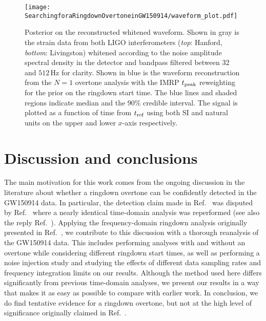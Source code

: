 \begin{figure*}[t]
	\centering
	\texttt{[image: SearchingforaRingdownOvertoneinGW150914/waveform\_plot.pdf]}
	\caption[Posterior on the GW150914 reconstructed whitened waveform]{ 
		Posterior on the reconstructed whitened waveform.
		Shown in gray is the strain data from both LIGO interferometers (\emph{top}: Hanford, \emph{bottom}: Livingston) whitened according to the noise amplitude spectral density in the detector and bandpass filtered between 32 and $512\,\mathrm{Hz}$ for clarity.
		Shown in blue is the waveform reconstruction from the $N=1$ overtone analysis with the IMRP $t_{\rm peak}$ reweighting for the prior on the ringdown start time.
		The blue lines and shaded regions indicate median and the 90\% credible interval. 
		The signal is plotted as a function of time from $t_{\rm ref}$ using both SI and natural units on the upper and lower $x$-axis respectively.
	}
	\label{fig:waveform}
\end{figure*}


\section{Discussion and conclusions}\label{ch4:sec:discussion}

The main motivation for this work comes from the ongoing discussion in the literature about whether a ringdown overtone can be confidently detected in the GW150914 data. 
In particular, the detection claim made in Ref.~\cite{Isi:2019aib} was disputed by Ref.~\cite{Cotesta:2022pci} where a nearly identical time-domain analysis was reperformed (see also the reply Ref.~\cite{Isi:2022mhy}).
Applying the frequency-domain ringdown analysis originally presented in Ref.~\cite{Finch:2021qph}, we contribute to this discussion with a thorough reanalysis of the GW150914 data. 
This includes performing analyses with and without an overtone while considering different ringdown start times, as well as performing a noise injection study and studying the effects of different data sampling rates and frequency integration limits on our results.
Although the method used here differs significantly from previous time-domain analyses, we present our results in a way that makes it as easy as possible to compare with earlier work.
In conclusion, we do find tentative evidence for a ringdown overtone, but not at the high level of significance originally claimed in Ref.~\cite{Isi:2019aib}.

